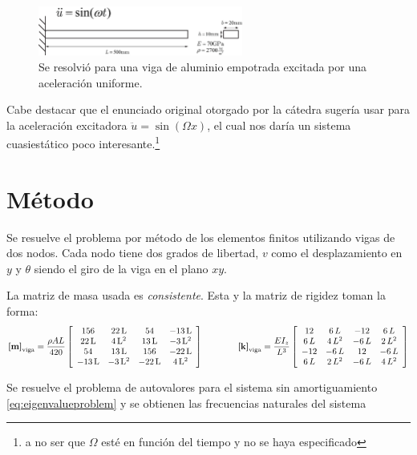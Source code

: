 \documentclass[onecolumn,10pt,titlepage,a4paper]{article}
\begin{document}
\begin{figure}[htb!]
	\centering
	\includegraphics[width=0.6\textwidth]{fig/enunciado.eps}
	\caption{Se resolvió para una viga de aluminio empotrada excitada por una aceleración uniforme.}\label{fig:enunciado}
\end{figure}
Cabe destacar que el enunciado original otorgado por la cátedra sugería usar para la aceleración excitadora $\ddot{u}=\sin (\Omega x)$, el cual nos daría un sistema cuasiestático poco interesante.\footnote{a no ser que $\Omega$ esté en función del tiempo y no se haya especificado}

\section{Método}
Se resuelve el problema por método de los elementos finitos utilizando vigas de dos nodos. Cada nodo tiene dos grados de libertad, $v$ como el desplazamiento en $y$ y $\theta$ siendo el giro de la viga en el plano $x\!y$.

La matriz de masa usada es \textit{consistente}. Esta y la matriz de rigidez toman la forma: \cite[p.379]{cook2007concepts}
\[
\boldsymbol{[}\mathbf{m} \boldsymbol{]}_{\mathrm{viga}}=\frac{\rho A L}{420}\left[\begin{array}{cccc} 156 & 22\,\mathrm{L} & 54 & -13\,\mathrm{L}\\ 22\,\mathrm{L} & 4\,{\mathrm{L}}^2 & 13\,\mathrm{L} & -3\,{\mathrm{L}}^2\\ 54 & 13\,\mathrm{L} & 156 & -22\,\mathrm{L}\\ -13\,\mathrm{L} & -3\,{\mathrm{L}}^2 & -22\,\mathrm{L} & 4\,{\mathrm{L}}^2 \end{array}\right] \qquad \qquad \boldsymbol{[}\mathbf{k} \boldsymbol{]}_{\mathrm{viga}}=\frac{E I_z}{L^3} \left[\begin{array}{cccc} 12 & 6\,L & -12 & 6\,L\\ 6\,L & 4\,L^2 & -6\,L & 2\,L^2\\ -12 & -6\,L & 12 & -6\,L\\ 6\,L & 2\,L^2 & -6\,L & 4\,L^2 \end{array}\right]
\]

Se resuelve el problema de autovalores para el sistema sin amortiguamiento \eqref{eq:eigenvalueproblem} y se obtienen las frecuencias naturales del sistema 
\end{document}
